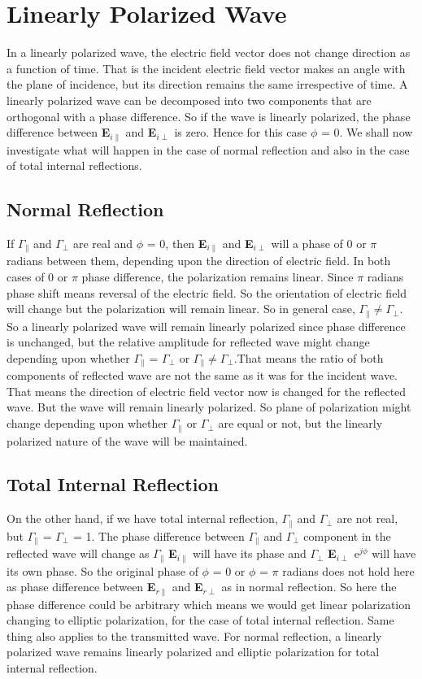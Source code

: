 \section{Linearly Polarized Wave}
In a linearly polarized wave, the electric field vector does not change direction as a function of time. That is the incident electric field vector makes an angle with the plane of incidence, but its direction remains the same irrespective of time. A linearly polarized wave can be decomposed into two components that are orthogonal with a phase difference. So if the wave is linearly polarized, the phase difference between \textbf{E}$_{i\parallel}$ and \textbf{E}$_{i\perp}$ is zero. Hence for this case $\phi$ = 0. We shall now investigate what will happen in the case of normal reflection and also in the case of total internal reflections.
\subsection{Normal Reflection}
If $\Gamma_\parallel$ and $\Gamma_\perp$ are real and $\phi$ = 0, then \textbf{E}$_{i\parallel}$ and \textbf{E}$_{i\perp}$ will a phase of 0 or $\pi$ radians between them, depending upon the direction of electric field. In both cases of 0 or $\pi$ phase difference, the polarization remains linear. Since $\pi$ radians phase shift means reversal of the electric field. So the orientation of electric field will change but the polarization will remain linear. So in general case, $\Gamma_\parallel \neq \Gamma_\perp$. So a linearly polarized wave will remain linearly polarized since phase difference is unchanged, but the relative amplitude for reflected wave might change depending upon whether $\Gamma_\parallel$ = $\Gamma_\perp$ or $\Gamma_\parallel \neq \Gamma_\perp$.That means the ratio of both components of reflected wave are not the same as it was for the incident wave. That means the direction of electric field vector now is changed for the reflected wave. But the wave will remain linearly polarized. So plane of polarization might change depending upon whether $\Gamma_\parallel$ or $\Gamma_\perp$ are equal or not, but the linearly polarized nature of the wave will be maintained.
\subsection{Total Internal Reflection}
On the other hand, if we have total internal reflection, $\Gamma_\parallel$ and $\Gamma_\perp$ are not real, but $\Gamma_\parallel$ = $\Gamma_\perp$ = 1. The phase difference between $\Gamma_\parallel$ and $\Gamma_\perp$ component in the reflected wave will change as $\Gamma_\parallel$ \textbf{E}$_{i\parallel}$ will have its phase and $\Gamma_\perp$ \textbf{E}$_{i\perp}$ e$^{j\phi}$ will have its own phase. So the original phase of $\phi$  = 0 or $\phi$ = $\pi$ radians does not hold here as phase difference between \textbf{E}$_{r\parallel}$  and \textbf{E}$_{r\perp}$ as in normal reflection. So here the phase difference could be arbitrary which means we would get linear polarization changing to elliptic polarization, for the case of total internal reflection. Same thing also applies to the transmitted wave. For normal reflection, a linearly polarized wave remains linearly polarized and elliptic polarization for total internal reflection.
